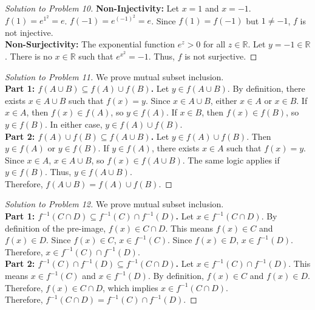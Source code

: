 \documentclass[11pt, letterpaper]{article}
\theoremstyle{definition}
\theoremstyle{remark}
\newcommand{\R}{\mathbb{R}}
\begin{document}
\begin{proof}[Solution to Problem 10]
\textbf{Non-Injectivity:} Let $x = 1$ and $x = -1$. $f(1) = e^{1^2} = e$. $f(-1) = e^{(-1)^2} = e$. Since $f(1) = f(-1)$ but $1 \neq -1$, $f$ is not injective. \\
\textbf{Non-Surjectivity:} The exponential function $e^z > 0$ for all $z \in \R$. Let $y = -1 \in \R$. There is no $x \in \R$ such that $e^{x^2} = -1$. Thus, $f$ is not surjective.
\end{proof}

\begin{proof}[Solution to Problem 11]
We prove mutual subset inclusion. \\
\textbf{Part 1: $f(A \cup B) \subseteq f(A) \cup f(B)$.} Let $y \in f(A \cup B)$. By definition, there exists $x \in A \cup B$ such that $f(x) = y$. Since $x \in A \cup B$, either $x \in A$ or $x \in B$. If $x \in A$, then $f(x) \in f(A)$, so $y \in f(A)$. If $x \in B$, then $f(x) \in f(B)$, so $y \in f(B)$. In either case, $y \in f(A) \cup f(B)$. \\
\textbf{Part 2: $f(A) \cup f(B) \subseteq f(A \cup B)$.} Let $y \in f(A) \cup f(B)$. Then $y \in f(A)$ or $y \in f(B)$. If $y \in f(A)$, there exists $x \in A$ such that $f(x) = y$. Since $x \in A$, $x \in A \cup B$, so $f(x) \in f(A \cup B)$. The same logic applies if $y \in f(B)$. Thus, $y \in f(A \cup B)$. \\
Therefore, $f(A \cup B) = f(A) \cup f(B)$.
\end{proof}

\begin{proof}[Solution to Problem 12]
We prove mutual subset inclusion. \\
\textbf{Part 1: $f^{-1}(C \cap D) \subseteq f^{-1}(C) \cap f^{-1}(D)$.} Let $x \in f^{-1}(C \cap D)$. By definition of the pre-image, $f(x) \in C \cap D$. This means $f(x) \in C$ and $f(x) \in D$. Since $f(x) \in C$, $x \in f^{-1}(C)$. Since $f(x) \in D$, $x \in f^{-1}(D)$. Therefore, $x \in f^{-1}(C) \cap f^{-1}(D)$. \\
\textbf{Part 2: $f^{-1}(C) \cap f^{-1}(D) \subseteq f^{-1}(C \cap D)$.} Let $x \in f^{-1}(C) \cap f^{-1}(D)$. This means $x \in f^{-1}(C)$ and $x \in f^{-1}(D)$. By definition, $f(x) \in C$ and $f(x) \in D$. Therefore, $f(x) \in C \cap D$, which implies $x \in f^{-1}(C \cap D)$. \\
Therefore, $f^{-1}(C \cap D) = f^{-1}(C) \cap f^{-1}(D)$.
\end{proof}
\end{document}
